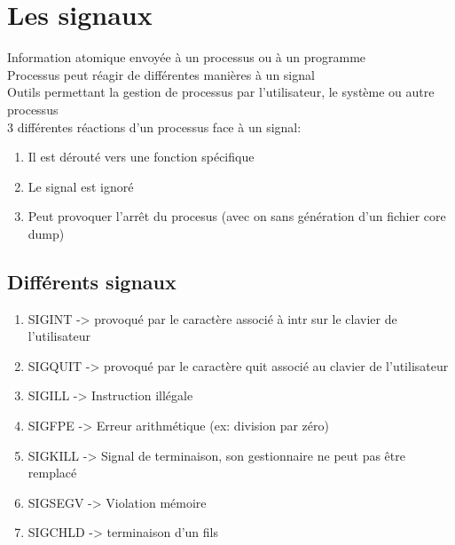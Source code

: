 \section{Les signaux}
Information atomique envoyée à un processus ou à un programme\\
Processus peut réagir de différentes manières à un signal\\
Outils permettant la gestion de processus par l'utilisateur, le système ou autre processus\\
3 différentes réactions d'un processus face à un signal:
\begin{enumerate}
\item Il est dérouté vers une fonction spécifique
\item Le signal est ignoré
\item Peut provoquer l'arrêt du procesus (avec on sans génération d'un fichier core dump)
\end{enumerate}

\subsection{Différents signaux}
\begin{enumerate}
\item SIGINT -> provoqué par le caractère associé à intr sur le clavier de l'utilisateur
\item SIGQUIT -> provoqué par le caractère quit associé au clavier de l'utilisateur
\item SIGILL -> Instruction illégale
\item SIGFPE -> Erreur arithmétique (ex: division par zéro)
\item SIGKILL -> Signal de terminaison, son gestionnaire ne peut pas être remplacé
\item SIGSEGV -> Violation mémoire
\item SIGCHLD -> terminaison d'un fils
\end{enumerate}
